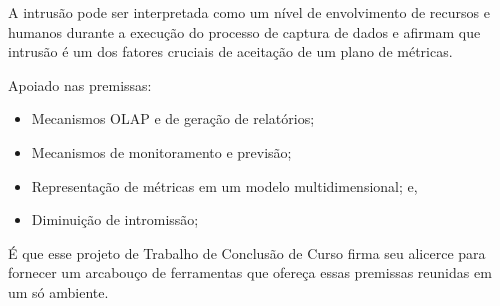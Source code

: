 A intrusão pode ser interpretada como um nível de envolvimento de recursos e humanos durante a execução do processo de captura de dados e  afirmam que intrusão é um dos fatores cruciais de aceitação de um plano de métricas.

Apoiado nas premissas:
\begin{itemize}
	\item Mecanismos OLAP e de geração de relatórios;
	\item Mecanismos de monitoramento e previsão;
	\item Representação de métricas em um modelo multidimensional; e,
	\item Diminuição de intromissão;
\end{itemize}

É que esse projeto de Trabalho de Conclusão de Curso firma seu alicerce para fornecer um arcabouço de ferramentas que ofereça essas premissas reunidas em um só ambiente.

